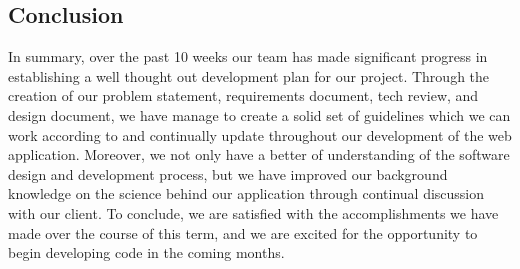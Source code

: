 \documentclass[onecolumn, draftclsnofoot,10pt, compsoc]{IEEEtran}
\begin{document}
\begin{flushleft}
\section{Conclusion}
In summary, over the past 10 weeks our team has made significant progress in establishing a well thought out development plan for our project. Through the creation of our problem statement, requirements document, tech review, and design document, we have manage to create a solid set of guidelines which we can work according to and continually update throughout our development of the web application. Moreover, we not only have a better of understanding of the software design and development process, but we have improved our background knowledge on the science behind our application through continual discussion with our client. To conclude, we are satisfied with the accomplishments we have made over the course of this term, and we are excited for the opportunity to begin developing code in the coming months.

\end{flushleft}
\end{document}
